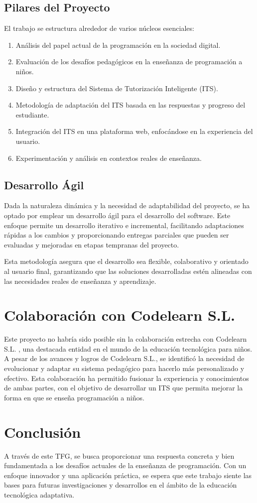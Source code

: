 \subsection{Pilares del Proyecto}
El trabajo se estructura alrededor de varios núcleos esenciales:

\begin{enumerate}
\item Análisis del papel actual de la programación en la sociedad digital.
\item Evaluación de los desafíos pedagógicos en la enseñanza de programación a niños.
\item Diseño y estructura del Sistema de Tutorización Inteligente (ITS).
\item Metodología de adaptación del ITS basada en las respuestas y progreso del estudiante.
\item Integración del ITS en una plataforma web, enfocándose en la experiencia del usuario.
\item Experimentación y análisis en contextos reales de enseñanza.
\end{enumerate}

\subsection{Desarrollo Ágil}
Dada la naturaleza dinámica y la necesidad de adaptabilidad del proyecto, se ha optado por emplear un desarrollo ágil para el desarrollo del software. Este enfoque permite un desarrollo iterativo e incremental, facilitando adaptaciones rápidas a los cambios y proporcionando entregas parciales que pueden ser evaluadas y mejoradas en etapas tempranas del proyecto.

Esta metodología asegura que el desarrollo sea flexible, colaborativo y orientado al usuario final, garantizando que las soluciones desarrolladas estén alineadas con las necesidades reales de enseñanza y aprendizaje.

\section{Colaboración con Codelearn S.L.}
Este proyecto no habría sido posible sin la colaboración estrecha con Codelearn S.L.  \cite{codelearn}, una destacada entidad en el mundo de la educación tecnológica para niños. A pesar de los avances y logros de Codelearn S.L., se identificó la necesidad de evolucionar y adaptar su sistema pedagógico para hacerlo más personalizado y efectivo. Esta colaboración ha permitido fusionar la experiencia y conocimientos de ambas partes, con el objetivo de desarrollar un ITS que permita mejorar la forma en que se enseña programación a niños.

\section{Conclusión}
A través de este TFG, se busca proporcionar una respuesta concreta y bien fundamentada a los desafíos actuales de la enseñanza de programación. Con un enfoque innovador y una aplicación práctica, se espera que este trabajo siente las bases para futuras investigaciones y desarrollos en el ámbito de la educación tecnológica adaptativa.
